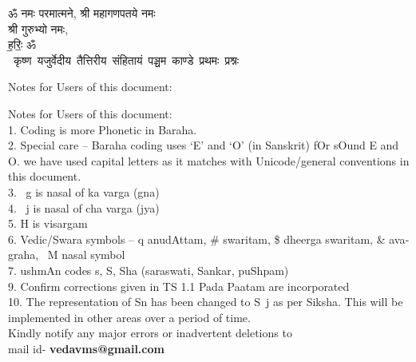 \begin{titlepage}
    \begin{center}
 
\begin{sanskrit}
    { \Large
    ॐ नमः परमात्मने, श्री महागणपतये नमः\\ 
    श्री गुरुभ्यो नमः,\\
     ह॒रिः॒ ॐ 
    }
    \\
    \vspace{2.5cm}
    \mbox{ \Large
    कृष्ण यजुर्वेदीय तैत्तिरीय संहितायं पञ्चम काण्डे प्रथमः प्रश्नः 
    }
    
\end{sanskrit}
\end{center}

\end{titlepage}

\pagebreak

\begin{english}
    
    
    {
    
        Notes for Users of this document:\newline%
    
        Notes for Users of this document: \\
        1. Coding is more Phonetic in Baraha. \\
        2. Special care – Baraha coding uses ‘E’ and ‘O’ (in Sanskrit) fOr sOund E and O. we have used capital letters as it matches with Unicode/general conventions in this document. \\
        3. ~g is nasal of ka varga (gna) \\
        4. ~j is nasal of cha varga (jya) \\
        5. H is visargam \\
        6.  Vedic/Swara symbols – q anudAttam, \# swaritam, \$ dheerga swaritam, \& avagraha,  ~M nasal symbol \\
        7.  ushmAn codes s, S, Sha (saraswati, Sankar, puShpam) \\
        9. Confirm corrections given in TS 1.1 Pada Paatam are incorporated \\
        10. The representation of Sn has been changed to S~j as per Siksha. This will be implemented in other areas over a period of time. \\
    
    Kindly notify any major errors or inadvertent deletions to \\
    mail id- \textbf{vedavms@gmail.com}
    }
    \end{english}\par
\pagebreak

\tableofcontents

\pagebreak


